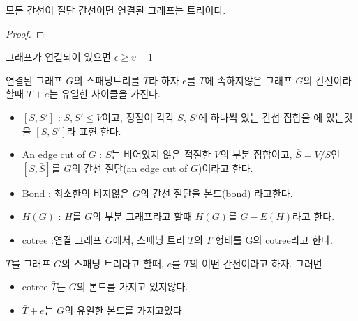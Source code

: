 \begin{theorem}
    모든 간선이 절단 간선이면 연결된 그래프는 트리이다.
\end{theorem}

\begin{proof}
    
\end{proof}

\begin{corollary}
    그래프가 연결되어 있으면 $\epsilon \ge v-1 $    
\end{corollary}
    
\begin{theorem}
    연결된 그래프 $G$의 스패닝트리를 $T$라 하자 $e$를 $T$에 속하지않은 그래프 $G$의 간선이라할때
    $T+e$는 유일한 사이클을 가진다.
\end{theorem}

\begin{dfn}
    \begin{itemize}
        \item  $[S,S']$ : $S,S' \le V$이고, 정점이 각각 $S$, $S'$에 하나씩 있는 간섭 집합을 에 있는것을 $[S,S']$라 표현 한다.
    
        \item  An edge cut of $G$ : $S$는 비어있지 않은 적절한 $V$의 부분 집합이고, $\bar{S} = V/S$인  $[S,\bar{S}]$를 $G$의 간선 절단(an edge cut of $G$)이라고 한다.

        \item  Bond : 최소한의 비지않은 $G$의 간선 절단을 본드(bond) 라고한다.

        \item $\bar{H}(G)$ : $H$를 $G$의 부분 그래프라고 할때 $\bar{H}(G)$를 $G-E(H)$라고 한다. 
    
        \item cotree :연결 그래프 $G$에서, 스패닝 트리 $T$의 $\bar{T}$ 형태를 G의 cotree라고 한다.
    \end{itemize}
\end{dfn}
\begin{theorem}
    $T$를 그래프 $G$의 스패닝 트리라고 할때, $e$를 $T$의 어떤 간선이라고 하자. 그러면
    \begin{itemize}
        \item cotree $\bar{T}$는 $G$의 본드를 가지고 있지않다.        
        \item $\bar{T}+e$는 $G$의 유일한 본드를 가지고있다
    \end{itemize}
\end{theorem}


